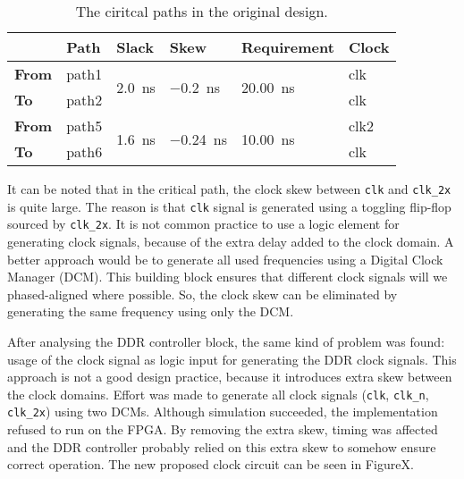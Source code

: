 \documentclass[final]{article}
\begin{document}
\begin{table}
\centering
\caption{The ciritcal paths in the original design.}
\label{tab:crit-path-orig}
\begin{tabular}{llllll}
    \toprule
         & \textbf{Path}  & \textbf{Slack}                     & \textbf{Skew}                       & \textbf{Requirement}                & \textbf{Clock} \\ 
    \midrule
    \textbf{From} & path1 & \multirow{2}{*}{\SI{2.0}{\nano\second}} & \multirow{2}{*}{\SI{-0.2}{\nano\second}}  & \multirow{2}{*}{\SI{20.00}{\nano\second}} & clk   \\
    \textbf{To}   & path2 &                           &                             &                            & clk   \\ 
    \midrule
    \textbf{From} & path5 & \multirow{2}{*}{\SI{1.6}{\nano\second}} & \multirow{2}{*}{\SI{-0.24}{\nano\second}} & \multirow{2}{*}{\SI{10.00}{\nano\second}} & clk2  \\
    \textbf{To}   & path6 &                           &                             &                            & clk   \\ 
    \bottomrule
\end{tabular}
\end{table}

It can be noted that in the critical path, the clock skew between \texttt{clk} and \texttt{clk\_2x} is quite large.
The reason is that \texttt{clk} signal is generated using a toggling flip-flop sourced by \texttt{clk\_2x}.
It is not common practice to use a logic element for generating clock signals, because of the extra delay added to the clock domain.
A better approach would be to generate all used frequencies using a Digital Clock Manager (DCM).
This building block ensures that different clock signals will we phased-aligned where possible.
So, the clock skew can be eliminated by generating the same frequency using only the DCM.

After analysing the DDR controller block, the same kind of problem was found: usage of the clock signal as logic input for generating the DDR clock signals.
This approach is not a good design practice, because it introduces extra skew between the clock domains.
Effort was made to generate all clock signals (\texttt{clk}, \texttt{clk\_n}, \texttt{clk\_2x}) using two DCMs.
Although simulation succeeded, the implementation refused to run on the FPGA.
By removing the extra skew, timing was affected and the DDR controller probably relied on this extra skew to somehow ensure correct operation.
The new proposed clock circuit can be seen in FigureX.
\end{document}
